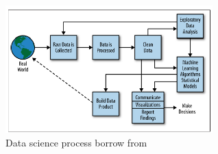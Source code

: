 \documentclass[12pt,a4paper]{article}
\begin{document}
\begin{figure}[h]
\centerline{\includegraphics[width=8cm]{Figure2-2}}
\caption{Data science process borrow from \cite{schutt2013doing}}
\label{fig1}
\end{figure}



\end{document}
